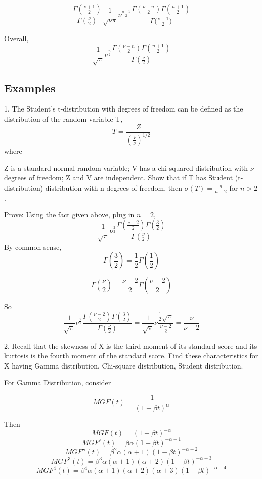 \documentclass{article}
\begin{document}
$$ \frac{\Gamma(\frac{\nu+1}{2})}{\Gamma(\frac{\nu}{2})} \frac{1}{\sqrt{\nu \pi}} \nu^{\frac{n+1}{2}} \frac{\Gamma(\frac{\nu-n}{2})\Gamma(\frac{n+1}{2})}{\Gamma{(\frac{\nu+1}{2}})}$$

Overall,
$$  \frac{1}{\sqrt{ \pi}} \nu^{\frac{n}{2}} \frac{\Gamma(\frac{\nu-n}{2})\Gamma(\frac{n+1}{2})}{\Gamma(\frac{\nu}{2})}$$

\subsection{Examples}

1. The Student's t-distribution with  degrees of freedom can be defined as the distribution of the random variable T,
$$T = \frac{Z}{(\frac{V}{\nu})^{1/2}}$$
where

Z  is a standard normal random variable;
V  has a chi-squared distribution with $\nu$ degrees of freedom;
Z and V are independent.
Show that if T has Student (t-distribution) distribution with n degrees of freedom, then $\sigma{(T)} = \frac{n}{n-2}$ for $n>2$.

Prove:
Using the fact given above, plug in $n = 2$, 
$$  \frac{1}{\sqrt{ \pi}} \nu^{\frac{2}{2}} \frac{\Gamma(\frac{\nu-2}{2})\Gamma(\frac{3}{2})}{\Gamma(\frac{\nu}{2})}$$
By common sense, 
$$\Gamma(\frac{3}{2}) = \frac{1}{2} \Gamma(\frac{1}{2})$$

$$\Gamma(\frac{\nu}{2}) = \frac{\nu-2}{2} \Gamma(\frac{\nu-2}{2})$$

So $$  \frac{1}{\sqrt{ \pi}} \nu^{\frac{2}{2}} \frac{\Gamma(\frac{\nu-2}{2})\Gamma(\frac{3}{2})}{\Gamma(\frac{\nu}{2})} = \frac{1}{\sqrt{ \pi}} \nu\frac{\frac{1}{2}\sqrt{\pi}}{\frac{\nu-2}{2}} =\frac\nu{\nu-2}  $$

2. Recall that the skewness of X is the third moment of its standard score and its kurtosis is the fourth moment of the standard score. Find these characteristics for X having Gamma distribution, Chi-square distribution, Student distribution.

For Gamma Distribution, consider 

$$MGF(t) = \frac{1}{(1-\beta t) ^ \alpha }$$

Then 
$$MGF(t) = {(1-\beta t) ^ {-\alpha} }$$
$$MGF'(t) = \beta \alpha {(1-\beta t) ^ {-\alpha-1} }$$
$$MGF''(t) = \beta^2 \alpha ({\alpha+1}){(1-\beta t) ^ {-\alpha-2} }$$
$$MGF^{3}(t) = \beta^3 \alpha ({\alpha+1})({\alpha+2}){(1-\beta t) ^ {-\alpha-3} }$$
$$MGF^{4}(t) = \beta^4 \alpha ({\alpha+1})({\alpha+2})({\alpha+3}){(1-\beta t) ^ {-\alpha-4} }$$
\end{document}
